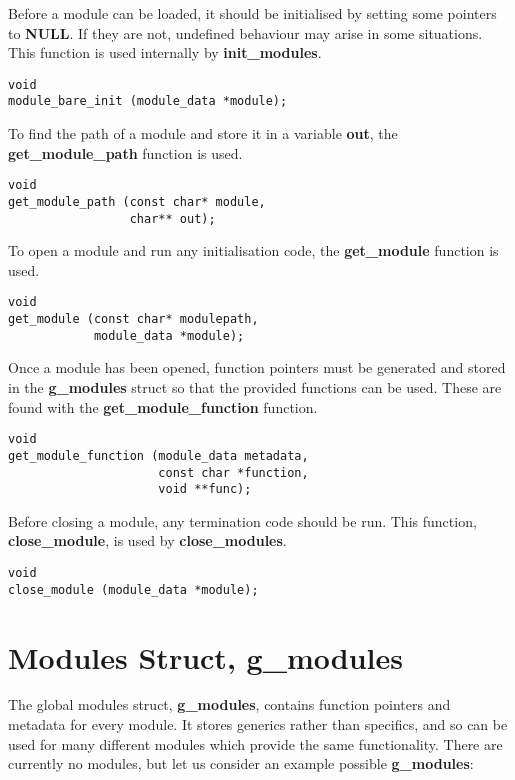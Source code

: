 \documentclass[12pt,a4paper]{article}
\begin{document}
Before a module can be loaded, it should be initialised by setting some pointers to \textbf{NULL}. If they are not, undefined behaviour may arise in some situations. This function is used internally by \textbf{init\_modules}.

\begin{lstlisting}
void
module_bare_init (module_data *module);
\end{lstlisting}

To find the path of a module and store it in a variable \textbf{out}, the \textbf{get\_module\_path} function is used.

\begin{lstlisting}
void
get_module_path (const char* module,
                 char** out);
\end{lstlisting}

To open a module and run any initialisation code, the \textbf{get\_module} function is used.

\begin{lstlisting}
void
get_module (const char* modulepath,
            module_data *module);
\end{lstlisting}

Once a module has been opened, function pointers must be generated and stored in the \textbf{g\_modules} struct so that the provided functions can be used. These are found with the \textbf{get\_module\_function} function.

\begin{lstlisting}
void
get_module_function (module_data metadata,
                     const char *function,
                     void **func);
\end{lstlisting}

Before closing a module, any termination code should be run. This function, \textbf{close\_module}, is used by \textbf{close\_modules}.

\begin{lstlisting}
void
close_module (module_data *module);
\end{lstlisting}

\section{Modules Struct, g\_modules}

The global modules struct, \textbf{g\_modules}, contains function pointers and metadata for every module. It stores generics rather than specifics, and so can be used for many different modules which provide the same functionality. There are currently no modules, but let us consider an example possible \textbf{g\_modules}:
\end{document}
